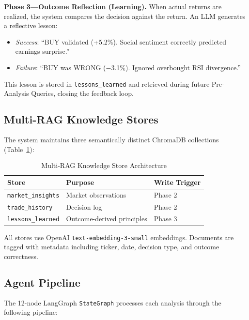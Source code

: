 \documentclass[conference]{IEEEtran}
\begin{document}
\textbf{Phase 3---Outcome Reflection (Learning).} When actual returns are realized, the system compares the decision against the return. An LLM generates a reflective lesson:
\begin{itemize}
\item \textit{Success}: ``BUY validated (+5.2\%). Social sentiment correctly predicted earnings surprise.''
\item \textit{Failure}: ``BUY was WRONG ($-$3.1\%). Ignored overbought RSI divergence.''
\end{itemize}
This lesson is stored in \texttt{lessons\_learned} and retrieved during future Pre-Analysis Queries, closing the feedback loop.

\subsection{Multi-RAG Knowledge Stores}

The system maintains three semantically distinct ChromaDB collections (Table~\ref{tab:stores}):

\begin{table}[htbp]
\caption{Multi-RAG Knowledge Store Architecture}
\label{tab:stores}
\centering
\begin{tabular}{@{}lll@{}}
\toprule
\textbf{Store} & \textbf{Purpose} & \textbf{Write Trigger} \\
\midrule
\texttt{market\_insights} & Market observations & Phase 2 \\
\texttt{trade\_history} & Decision log & Phase 2 \\
\texttt{lessons\_learned} & Outcome-derived principles & Phase 3 \\
\bottomrule
\end{tabular}
\end{table}

All stores use OpenAI \texttt{text-embedding-3-small} embeddings. Documents are tagged with metadata including ticker, date, decision type, and outcome correctness.

\subsection{Agent Pipeline}

The 12-node LangGraph \texttt{StateGraph} processes each analysis through the following pipeline:
\end{document}

